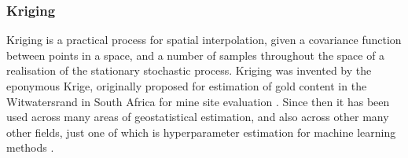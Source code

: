 \documentclass[12pt,a4paper]{article} %
\begin{document}
\subsubsection{Kriging}
\label{subsec:kriging}
Kriging is a practical process for spatial interpolation, given a covariance function between points in a space, and a number of samples throughout the space of a realisation of the stationary stochastic process. Kriging was invented by the eponymous Krige, originally proposed for estimation of gold content in the Witwatersrand in South Africa for mine site evaluation \cite{krige}. Since then it has been used across many areas of geostatistical estimation, and also across other many other fields, just one of which is hyperparameter estimation for machine learning methods \cite{hyperkrige}.\\\\
\end{document}
